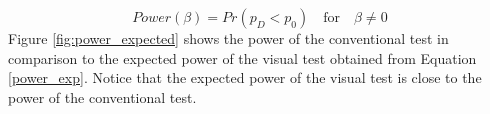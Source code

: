 \documentclass[12pt]{article}
\newtheorem{thm}{Theorem}[section]
\begin{document}
\begin{equation}\label{power_exp} 
   Power(\beta)=Pr(p_{D} < p_0)  \quad \text{for}  \quad \beta \ne 0
\end{equation}
Figure \ref{fig:power_expected} shows the power of the conventional test in comparison to the expected power of the visual test obtained from Equation \ref{power_exp}. Notice that the expected power of the visual test is %
close to the power of the conventional test. 


% 
%
%
%
%
%
\end{document}
